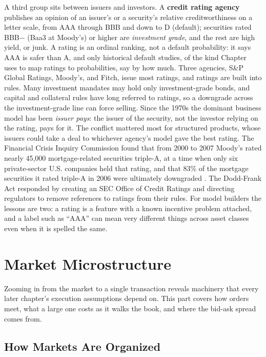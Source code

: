 \documentclass[../ai_in_finance]{subfiles}
\begin{document}
A third group sits between issuers and investors. A \textbf{credit rating agency} publishes an opinion of an issuer's or a security's relative creditworthiness on a letter scale, from AAA through BBB and down to D (default); securities rated BBB$-$ (Baa3 at Moody's) or higher are \emph{investment grade}, and the rest are high yield, or junk. A rating is an ordinal ranking, not a default probability: it says AAA is safer than A, and only historical default studies, of the kind Chapter~ uses to map ratings to probabilities, say by how much. Three agencies, S\&P Global Ratings, Moody's, and Fitch, issue most ratings, and ratings are built into rules. Many investment mandates may hold only investment-grade bonds, and capital and collateral rules have long referred to ratings, so a downgrade across the investment-grade line can force selling. Since the 1970s the dominant business model has been \emph{issuer pays}: the issuer of the security, not the investor relying on the rating, pays for it. The conflict mattered most for structured products, whose issuers could take a deal to whichever agency's model gave the best rating. The Financial Crisis Inquiry Commission found that from 2000 to 2007 Moody's rated nearly 45,000 mortgage-related securities triple-A, at a time when only six private-sector U.S. companies held that rating, and that 83\% of the mortgage securities it rated triple-A in 2006 were ultimately downgraded \parencite{fcic2011report}. The Dodd-Frank Act responded by creating an SEC Office of Credit Ratings and directing regulators to remove references to ratings from their rules. For model builders the lessons are two: a rating is a feature with a known incentive problem attached, and a label such as ``AAA'' can mean very different things across asset classes even when it is spelled the same.

\section{Market Microstructure}

Zooming in from the market to a single transaction reveals machinery that every later chapter's execution assumptions depend on. This part covers how orders meet, what a large one costs as it walks the book, and where the bid-ask spread comes from.

\subsection{How Markets Are Organized}
\end{document}
